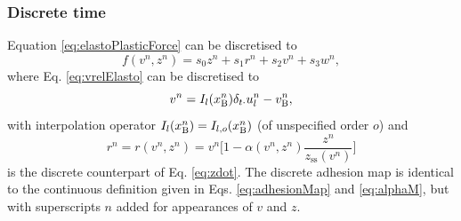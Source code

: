\subsubsection{Discrete time}
Equation \eqref{eq:elastoPlasticForce} can be discretised to
\begin{equation}\label{eq:discForceFunction}
    f(v^n,z^n) = s_0z^n + s_1r^n+s_2v^n+s_3w^n,
\end{equation} 
where Eq. \eqref{eq:vrelElasto} can be discretised to
\begin{equation}\label{eq:vrelElastoDisc}
    v^n = I_l(x_{\text{B}}^n)\delta_{t\cdot}u_l^n - v_{\text{B}}^n,
\end{equation}
with interpolation operator $I_l(x_{\text{B}}^n) = I_{l,o}(x_{\text{B}}^n)$ (of unspecified order $o$) and
\begin{equation}\label{eq:r}
    r^n = r(v^n,z^n) = v^n\bigg[1-\alpha(v^n,z^n)\frac{z^n}{z_\text{ss}(v^n)}\bigg]
\end{equation}
is the discrete counterpart of Eq. \eqref{eq:zdot}. The discrete adhesion map is identical to the continuous definition given in Eqs. \eqref{eq:adhesionMap} and \eqref{eq:alphaM}, but with superscripts $n$ added for appearances of $v$ and $z$.

